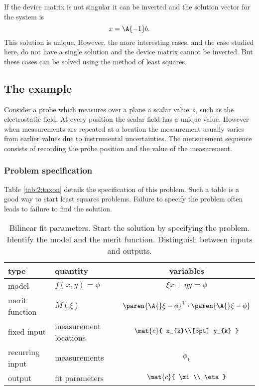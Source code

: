 If the device matrix is not singular it can be inverted and the solution vector for the system is
\begin{equation}
  x=\A{-1}b.
\end{equation}
This solution is unique. However, the more interesting cases, and the case studied here, do not have a single solution and the device matrix cannot be inverted. But these cases can be solved using the method of least squares.

\subsection{The example}
Consider a probe which measures over a plane a scalar value $\phi$, such as the electrostatic field. At every position the scalar field has a unique value. However when measurements are repeated at a location the measurement usually varies from earlier values due to instrumental uncertainties. The measurement sequence consists of recording the probe position and the value of the measurement. 

\subsubsection{Problem specification}
Table \eqref{tab:2:taxon} details the specification of this problem. Such a table is a good way to start least squares problems. Failure to specify the problem often leads to failure to find the solution.

\begin{table}[h]
\begin{center}
\begin{tabular}{llc}
  type & quantity & variables \\ \hline
  model & $f(x,y) = \phi$ & $\xi x + \eta y = \phi$ \\[3pt]
  merit function & $M(\xi)$ & $\paren{\A{}\xi - \phi}^{\mathrm{T}}\cdot\paren{\A{}\xi - \phi}$ \\[3pt]
  fixed input & measurement locations &
  $\mat{c}
  {
  x_{k}\\[3pt]
  y_{k}
  }$ \\[3pt]
  recurring input & measurements & $\phi_{k}$ \\[2pt]
  output & fit parameters &
  $\mat{c}
  {
  \xi\\
  \eta
  }$ \\
\end{tabular}
\end{center}
\caption[Bilinear fit parameters]{Bilinear fit parameters. Start the solution by specifying the problem. Identify the model and the merit function. Distinguish between inputs and outputs.}
\label{tab:2:taxon}
\end{table}%

